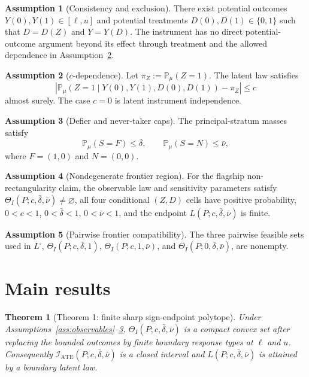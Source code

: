 \documentclass[11pt]{article}
\renewcommand{\Pr}{\mathbb{P}}
\theoremstyle{definition}
\newtheorem{assumption}{Assumption}
\theoremstyle{plain}
\newtheorem{theorem}{Theorem}
\theoremstyle{remark}
\begin{document}
\begin{assumption}[Consistency and exclusion]\label{ass:consistency}
There exist potential outcomes \(Y(0),Y(1)\in[\ell,u]\) and potential
treatments \(D(0),D(1)\in\{0,1\}\) such that \(D=D(Z)\) and
\(Y=Y(D)\).  The instrument has no direct potential-outcome argument beyond
its effect through treatment and the allowed dependence in
Assumption~\ref{ass:cdep}.
\end{assumption}

\begin{assumption}[\(c\)-dependence]\label{ass:cdep}
Let \(\pi_Z:=\Pr_\mu(Z=1)\).  The latent law satisfies
\[
  \left|\Pr_\mu(Z=1\mid Y(0),Y(1),D(0),D(1))-\pi_Z\right|\le c
\]
almost surely.  The case \(c=0\) is latent instrument independence.
\end{assumption}

\begin{assumption}[Defier and never-taker caps]\label{ass:caps}
The principal-stratum masses satisfy
\[
  \Pr_\mu(S=F)\le \bar\delta,\qquad
  \Pr_\mu(S=N)\le \bar\nu,
\]
where \(F=(1,0)\) and \(N=(0,0)\).
\end{assumption}

\begin{assumption}[Nondegenerate frontier region]\label{ass:nondegenerate}
For the flagship non-rectangularity claim, the observable law and sensitivity
parameters satisfy
\(\Theta_I(P;c,\bar\delta,\bar\nu)\ne\varnothing\), all four conditional
\((Z,D)\) cells have positive probability, \(0<c<1\),
\(0<\bar\delta<1\), \(0<\bar\nu<1\), and the endpoint
\(L(P;c,\bar\delta,\bar\nu)\) is finite.
\end{assumption}

\begin{assumption}[Pairwise frontier compatibility]\label{ass:pairwise}
The three pairwise feasible sets used in \(L^\square\),
\(\Theta_I(P;c,\bar\delta,1)\), \(\Theta_I(P;c,1,\bar\nu)\), and
\(\Theta_I(P;0,\bar\delta,\bar\nu)\), are nonempty.
\end{assumption}

\section{Main results}
\begin{theorem}[Theorem 1: finite sharp sign-endpoint polytope]\label{thm:polytope}
Under Assumptions~\ref{ass:observables}--\ref{ass:caps},
\(\Theta_I(P;c,\bar\delta,\bar\nu)\) is a compact convex set after replacing
the bounded outcomes by finite boundary response types at \(\ell\) and \(u\).
Consequently \(\mathcal I_{\mathrm{ATE}}(P;c,\bar\delta,\bar\nu)\) is a
closed interval and \(L(P;c,\bar\delta,\bar\nu)\) is attained by a boundary
latent law.
\end{theorem}
\end{document}
